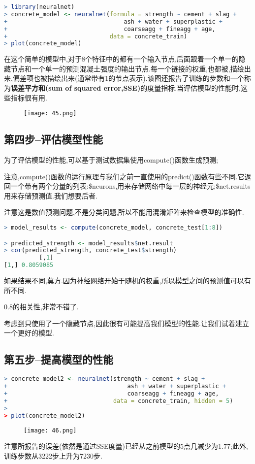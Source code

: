 \documentclass[11pt,a4paper,oneside]{book}
\begin{document}
\begin{lstlisting}[language=r]
> library(neuralnet)
> concrete_model <- neuralnet(formula = strength ~ cement + slag +
+                                 ash + water + superplastic + 
+                                 coarseagg + fineagg + age,
+                             data = concrete_train)
> plot(concrete_model)
\end{lstlisting}
在这个简单的模型中,对于8个特征中的都有一个输入节点,后面跟着一个单一的隐藏节点和一个单一的预测混凝土强度的输出节点.每一个链接的权重,也都被,描绘出来,偏差项也被描绘出来(通常带有1的节点表示).该图还报告了训练的步数和一个称为\textbf{误差平方和(sum of squared error,SSE)}的度量指标.当评估模型的性能时,这些指标很有用.
\begin{figure}[H]
	\centering
	\texttt{[image: 45.png]}
\end{figure}
\subsection{第四步--评估模型性能}
为了评估模型的性能,可以基于测试数据集使用compute()函数生成预测;

注意,compute()函数的运行原理与我们之前一直使用的predict()函数有些不同.它返回一个带有两个分量的列表:\$neurons,用来存储网络中每一层的神经元;\$net.results用来存储预测值.我们想要后者.

注意这是数值预测问题,不是分类问题,所以不能用混淆矩阵来检查模型的准确性.
\begin{lstlisting}[language=r]
> model_results <- compute(concrete_model, concrete_test[1:8])

> predicted_strength <- model_results$net.result
> cor(predicted_strength, concrete_test$strength)
          [,1]
[1,] 0.8059085
\end{lstlisting}
\begin{tcolorbox}[colback=pink!10!white,colframe=pink!100!black]
如果结果不同,莫方.因为神经网络开始于随机的权重,所以模型之间的预测值可以有所不同.
\end{tcolorbox}
0.8的相关性,非常不错了.

考虑到只使用了一个隐藏节点,因此很有可能提高我们模型的性能.让我们试着建立一个更好的模型.

\subsection{第五步--提高模型的性能}
\begin{lstlisting}[language=r]
> concrete_model2 <- neuralnet(strength ~ cement + slag +
+                                  ash + water + superplastic + 
+                                  coarseagg + fineagg + age,
+                              data = concrete_train, hidden = 5)
> 
> plot(concrete_model2)
\end{lstlisting}
\begin{figure}[H]
	\centering
	\texttt{[image: 46.png]}
\end{figure}
注意所报告的误差(依然是通过SSE度量)已经从之前模型的5点几减少为1.77;此外,训练步数从3222步上升为7230步.
\end{document}
